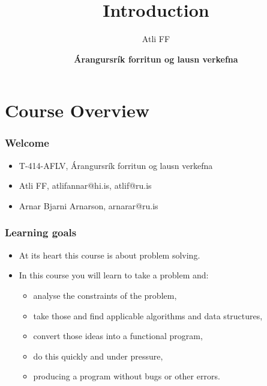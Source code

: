 \documentclass{beamer}
\title{Introduction}
\author{Atli FF}
\institute{\href{http://ru.is/td}{School of Computer Science} \\[2pt] \href{http://ru.is}{Reykjavík University}}
\date{\textbf{Árangursrík forritun og lausn verkefna}}
\begin{document}
\begin{frame}[plain]
    \titlepage
\end{frame}

\section*{Course Overview}

\begin{frame}[plain]
	\frametitle{Welcome}
	\begin{itemize}
		 \item T-414-AFLV, Árangursrík forritun og lausn verkefna
         \vspace{10pt}
         \item Atli FF, {\alert{atlifannar@hi.is}, \alert{atlif@ru.is}}
         \item Arnar Bjarni Arnarson, {\alert{arnarar@ru.is}}
	\end{itemize}
\end{frame}

\begin{frame}[plain]
	\frametitle{Learning goals}
	\begin{itemize}
		 \item At its heart this course is about problem solving.
		 \item In this course you will learn to take a problem and:
		 \begin{itemize}
		 	\item analyse the constraints of the problem,
		 	\item take those and find applicable algorithms and data structures,
		 	\item convert those ideas into a functional program,
		 	\item do this quickly and under pressure,
		 	\item producing a program without bugs or other errors.
		 \end{itemize}
	\end{itemize}
\end{frame}
\end{document}
